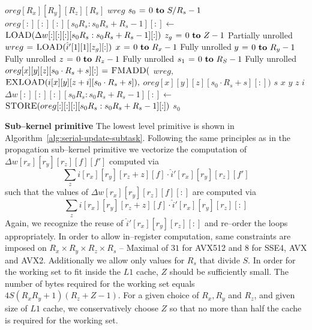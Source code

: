   \begin{algorithm}
    {\footnotesize
      \begin{codebox}
        \li {} $oreg[R_x][R_y][R_z][R_s]$
        \li {} $wreg$
        \li \For $s_0 \gets 0 \To S/R_s - 1$
        \li \Do $oreg[:][:][:][s_0R_s:s_0R_s+R_s-1][:] \gets$
        \li   \Do $\textnormal{\scshape LOAD}(\Delta w[:][:][:][s_0R_s:s_0R_s+R_s-1][:])$
        \End
        \li \For $z_g \gets 0 \To Z-1$ \Comment Partially unrolled
        \li   \Do $wreg \mathrel{\hspace{1pt}=\hspace{1pt}} \textnormal{\scshape LOAD}(\hat{i}'[1][1][z_g][:])$
        \li   \For $x \gets 0 \To R_x-1$ \Comment Fully unrolled
        \li   \Do \For $y \gets 0 \To R_y-1$  \Comment Fully unrolled
        \li   \Do \For $z \gets 0 \To R_z-1$  \Comment Fully unrolled
        \li   \Do \For $s_1 \gets 0 \To R_S-1$   \Comment Fully unrolled
        \li   \Do $oreg[x][y][z][s_0 \cdot R_s + s][:] \mathrel{\hspace{1pt}=\hspace{1pt}} \textnormal{\scshape FMADD}($
        \li   \Do $wreg,$
        \li       $\textnormal{\scshape EXLOAD}(i[x][y][z+i][s_0 \cdot R_s + s]),$
        \li       $oreg[x][y][z][s_0 \cdot R_s + s][:])$
        \End
        \End \li {} $s$
        \End \li {} $x$
        \End \li {} $y$
        \End \li {} $z$
        \End \li {} $i$
        \li $\Delta w[:][:][:][s_0R_s:s_0R_s+R_s-1][:] \gets$
        \li \Do $\textnormal{\scshape STORE}(oreg[:][:][:][s_0R_s:s_0R_s+R_s-1][:])$
        \End
        \End \li {} $s_0$
      \end{codebox}
    \caption{Finest granularity update primitive.}
    \label{alg:serial-update-subtask}
    }
  \end{algorithm}

  {\bf Sub--kernel primitive} \quad The lowest level primitive is
  shown in Algorithm~\ref{alg:serial-update-subtask}.  Following the
  same principles as in the propagation sub--kernel primitive we
  vectorize the computation of $\Delta w[r_x][r_y][r_z][f][f']$ computed
  via {\small
  \[
  \sum_{z}
  i[r_x][r_y][r_z+z][f] \cdot \hat{i}'[r_x][r_y][r_z][f']
  \]
  } such that the values of $\Delta w[r_x][r_y][r_z][f][:]$ are computed
  via {\small
  \[
  \sum_{z}
  i[r_x][r_y][r_z+z][f] \cdot \hat{i}'[r_x][r_y][r_z][:]
  \]
  } Again, we recognize the reuse of $\hat{i}'[r_x][r_y][r_z][:]$ and
  re--order the loops appropriately.  In order to allow in--register
  computation, same constraints are imposed on $R_x \times R_y \times
  R_z \times R_s$ -- Maximal of $31$ for AVX512 and $8$ for SSE4, AVX
  and AVX2.  Additionally we allow only values for $R_s$ that divide
  $S$.  In order for the working set to fit inside the $L1$ cache, $Z$
  should be sufficiently small.  The number of bytes required for the
  working set equals $4S(R_xR_y+1)(R_z+Z-1)$.  For a given choice of
  $R_x, R_y$ and $R_z$, and given size of $L1$ cache, we
  conservatively choose $Z$ so that no more than half the cache is
  required for the working set.

